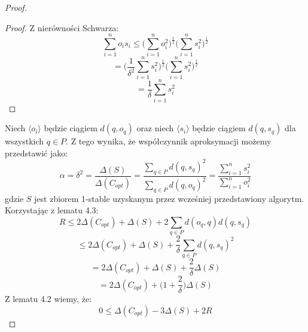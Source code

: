 \begin{proof}
\begin{lemma}{\cite{10.1145/1007352.1007400}}
    \end{lemma}
    \begin{proof}
        Z nierówności Schwarza:
        \begin{equation}
            \sum_{i=1}^{n} o_{i} s_{i} \leq \Big( \sum_{i=1}^{n} o_{i}^{2} \Big)^{\frac{1}{2}} \Big( \sum_{i=1}^{n} s_{i}^{2} \Big)^{\frac{1}{2}}
        \end{equation}
        \begin{equation}
            = \Big( \frac{1}{\delta^{2}}\sum_{i=1}^{n} s_{i}^{2} \Big)^{\frac{1}{2}} \Big( \sum_{i=1}^{n} s_{i}^{2} \Big)^{\frac{1}{2}}
        \end{equation}
        \begin{equation}
            = \frac{1}{\delta} \sum_{i=1}^{n} s_{i}^{2}
        \end{equation}
    \end{proof}
    Niech $\langle o_{i} \rangle$ będzie ciągiem $d(q, o_{q})$ oraz niech $\langle s_{i} \rangle$ będzie ciągiem $d(q,s_{q})$ dla wszystkich $q \in P$.
    Z tego wynika, że współczynnik aproksymacji możemy przedstawić jako:
    \begin{equation}
        \alpha = \delta^{2} = \frac{\Delta(S)}{\Delta(C_{opt})} = \frac{\sum_{q \in P} d(q,s_{q})^{2}}{\sum_{q \in P} d(q,o_{q})^{2}} =\frac{\sum_{i=1}^{n} s_{i}^{2}}{\sum_{i=1}^{n} o_{i}^{2}}
    \end{equation}
    gdzie $S$ jest zbiorem 1-stable uzyskanym przez wcześniej przedstawiony algorytm.
    Korzystając z lematu 4.3:
    \begin{equation}
        R \leq 2\Delta(C_{opt}) + \Delta(S) + 2\sum_{q \in P} d(o_{q}, q)d(q, s_{q}) 
    \end{equation}
    \begin{equation}
        \leq 2\Delta(C_{opt}) + \Delta(S) + \frac{2}{\delta}\sum_{q \in P} d(q, s_{q})^{2} 
    \end{equation}
    \begin{equation}
        = 2\Delta(C_{opt}) + \Delta(S) + \frac{2}{\delta}\Delta(S)
    \end{equation}
    \begin{equation}
        = 2\Delta(C_{opt}) + \Big(1 + \frac{2}{\delta} \Big)\Delta(S)
    \end{equation}
    Z lematu 4.2 wiemy, że:
    \begin{equation}
        0 \leq \Delta(C_{opt}) - 3\Delta(S) + 2R
    \end{equation}
    \begin{equation}

\end{equation}
\end{proof}
